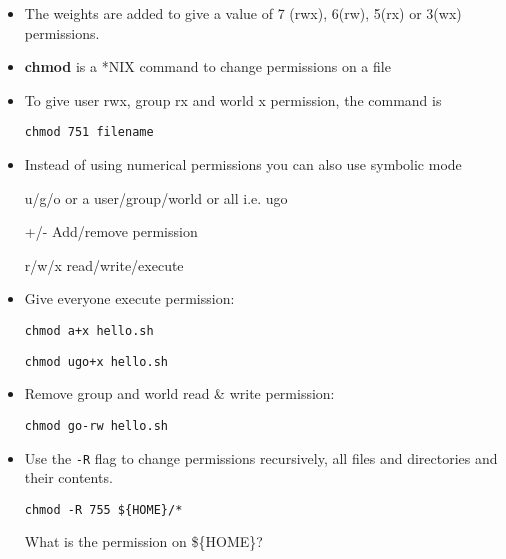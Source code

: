 \documentclass[slidestop,mathserif,compress,xcolor=svgnames]{beamer}
\begin{document}
\begin{frame}
\begin{itemize}
    \item The weights are added to give a value of 7 (rwx), 6(rw), 5(rx) or 3(wx) permissions. 
    \item \textbf{chmod} is a *NIX command to change permissions on a file
    \item To give user rwx, group rx and world x permission, the command is
    \item[] \texttt{chmod 751 filename}
    \framebreak
    \item Instead of using numerical permissions you can also use symbolic mode
    \item[u/g/o or a] user/group/world or all i.e. ugo
    \item[+/-] Add/remove permission
    \item[r/w/x] read/write/execute
    \item Give everyone execute permission: 
    \item[] \texttt{chmod a+x hello.sh }
    \item[] \texttt{chmod ugo+x hello.sh}
    \item Remove group and world read \& write permission: 
    \item[] \texttt{chmod go-rw hello.sh}
    \item Use the \texttt{-R} flag to change permissions recursively, all files and directories and their contents.
    \item[] \texttt{chmod -R 755 \$\{HOME\}/*}
    \item[] What is the permission on \$\{HOME\}?
  \end{itemize}
\end{frame}
\end{document}
